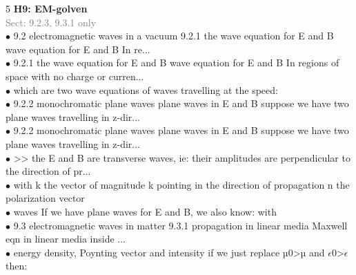 \documentclass[7pt,a4paper]{article}
\begin{document}
\begin{multicols*}{5}
\textbf{H9: EM-golven}\\\textcolor{gray}{{Sect: 9.2.3, 9.3.1 only}}\\\vspace{0.5pt}
$\bullet$ 9.2 electromagnetic waves in a vacuum
9.2.1 the wave equation for E and B
wave equation for E and B In re...\\
$\bullet$ 9.2.1 the wave equation for E and B
wave equation for E and B In regions of space with no charge or curren...\\
$\bullet$ which are two wave equations of waves travelling at the speed:\\
$\bullet$ 9.2.2 monochromatic plane waves
plane waves in E and B suppose we have two plane waves travelling in z-dir...\\
$\bullet$ 9.2.2 monochromatic plane waves
plane waves in E and B suppose we have two plane waves travelling in z-dir...\\
$\bullet$ >> the E and B are transverse waves,
        ie: their amplitudes are perpendicular to the direction of pr...\\
$\bullet$ with k the vector of magnitude k pointing in the direction of propagation
         n the polarization vector\\
$\bullet$ waves
If we have plane waves for E and B, we also know:
     with\\
$\bullet$ 9.3 electromagnetic waves in matter
9.3.1 propagation in linear media
Maxwell eqn in linear media inside ...\\
$\bullet$ energy density,
Poynting vector and intensity
if we just replace µ0>µ and $\epsilon$0>$\epsilon$ then:\\
\columnbreak


\end{multicols*}
\end{document}
